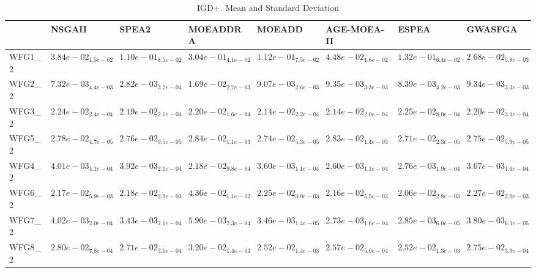 \documentclass{article}
\begin{document}
\begin{landscape}

\begin{table}
\caption{IGD+. Mean and Standard Deviation}
\label{table: IGD+}
\centering
\begin{scriptsize}
\begin{tabular}{llllllll}
\hline & NSGAII & SPEA2 & MOEADDRA & MOEADD & AGE-MOEA-II & ESPEA &  GWASFGA\\
\hline 
WFG1\_2 & \cellcolor{gray25}$  3.84e-02_{ 1.5e-02}$ & $  1.10e-01_{ 8.5e-02}$ & $  3.04e-01_{ 4.1e-02}$ & $  1.12e-01_{ 7.5e-02}$ & $  4.48e-02_{ 1.6e-02}$ & $  1.32e-01_{ 6.4e-02}$ & \cellcolor{gray95}$  2.68e-02_{ 5.8e-03}$ \\
WFG2\_2 & \cellcolor{gray25}$  7.32e-03_{ 4.4e-03}$ & \cellcolor{gray95}$  2.82e-03_{ 3.7e-04}$ & $  1.69e-02_{ 2.7e-03}$ & $  9.07e-03_{ 2.6e-03}$ & $  9.35e-03_{ 3.3e-03}$ & $  8.39e-03_{ 4.2e-03}$ & $  9.34e-03_{ 3.3e-03}$ \\
WFG3\_2 & $  2.24e-02_{ 2.4e-04}$ & $  2.19e-02_{ 2.7e-04}$ & $  2.20e-02_{ 1.6e-04}$ & \cellcolor{gray25}$  2.14e-02_{ 2.2e-04}$ & \cellcolor{gray95}$  2.14e-02_{ 2.0e-04}$ & $  2.25e-02_{ 8.0e-04}$ & $  2.20e-02_{ 3.1e-04}$ \\
WFG5\_2 & $  2.78e-02_{ 4.7e-05}$ & $  2.76e-02_{ 9.5e-05}$ & $  2.84e-02_{ 1.1e-03}$ & \cellcolor{gray25}$  2.74e-02_{ 5.3e-05}$ & $  2.83e-02_{ 1.4e-03}$ & \cellcolor{gray95}$  2.71e-02_{ 2.3e-05}$ & $  2.75e-02_{ 5.9e-05}$ \\
WFG4\_2 & $  4.01e-03_{ 4.1e-04}$ & $  3.92e-03_{ 2.1e-04}$ & $  2.18e-02_{ 9.8e-04}$ & $  3.60e-03_{ 1.1e-04}$ & \cellcolor{gray95}$  2.60e-03_{ 1.1e-04}$ & \cellcolor{gray25}$  2.76e-03_{ 1.9e-04}$ & $  3.67e-03_{ 1.6e-04}$ \\
WFG6\_2 & $  2.17e-02_{ 5.9e-03}$ & $  2.18e-02_{ 2.9e-03}$ & $  4.36e-02_{ 1.1e-02}$ & $  2.25e-02_{ 3.0e-03}$ & \cellcolor{gray25}$  2.16e-02_{ 5.5e-03}$ & \cellcolor{gray95}$  2.06e-02_{ 2.8e-03}$ & $  2.27e-02_{ 2.0e-03}$ \\
WFG7\_2 & $  4.02e-03_{ 2.0e-04}$ & $  3.43e-03_{ 2.1e-04}$ & $  5.90e-03_{ 2.3e-04}$ & $  3.46e-03_{ 1.4e-05}$ & \cellcolor{gray95}$  2.73e-03_{ 1.6e-04}$ & \cellcolor{gray25}$  2.85e-03_{ 6.0e-05}$ & $  3.80e-03_{ 6.1e-05}$ \\
WFG8\_2 & $  2.80e-02_{ 7.8e-04}$ & $  2.71e-02_{ 3.6e-04}$ & $  3.20e-02_{ 1.4e-03}$ & \cellcolor{gray95}$  2.52e-02_{ 1.4e-03}$ & $  2.57e-02_{ 5.0e-04}$ & \cellcolor{gray25}$  2.52e-02_{ 1.3e-03}$ & $  2.75e-02_{ 3.9e-04}$ \\

\end{tabular}
\end{scriptsize}
\end{table}
\end{landscape}
\end{document}
